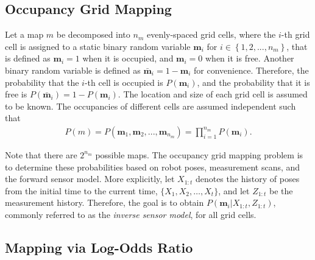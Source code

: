 \documentclass[letterpaper, 10pt, conference]{ieeeconf}
\newcommand{\braces}[1]{\ensuremath{\left\{ #1 \right\}}}
\begin{document}
	
\subsection{Occupancy Grid Mapping}

Let a map $m$ be decomposed into $n_m$ evenly-spaced grid cells, where the $i$-th grid cell is assigned to a static binary random variable $\mathbf{m}_i$ for $i\in\braces{1,2,...,n_m}$, that is defined as $\mathbf{m}_i=1$ when it is occupied, and $\mathbf{m}_i=0$ when it is free. Another binary random variable is defined as $\bar{\mathbf{m}}_i=1-\mathbf{m}_i$ for convenience.
Therefore, the probability that the $i$-th cell is occupied is $P(\mathbf{m}_i)$, and the probability that it is free is $P(\bar{\mathbf{m}}_i)=1-P(\mathbf{m}_i)$. The location and size of each grid cell is assumed to be known.
The occupancies of different cells are assumed independent such that
\begin{align}
P(m)=P(\mathbf{m}_1,\mathbf{m}_2,...,\mathbf{m}_{n_m})=\prod_{i=1}^{n_m}P(\mathbf{m}_i).
\end{align}

Note that there are $2^{n_{m}}$ possible maps. The occupancy grid mapping problem is to determine these probabilities based on robot poses, measurement scans, and the forward sensor model. More explicitly, let $X_{1:t}$ denotes the history of poses from the initial time to the current time, $\{X_1,X_2,\ldots, X_t\}$, and let $Z_{1:t}$ be the measurement history. Therefore, the goal is to obtain $P(\mathbf{m}_i|X_{1:t},Z_{1:t})$, commonly referred to as the \emph{inverse sensor model}, for all grid cells.

	
\subsection{Mapping via Log-Odds Ratio}
\end{document}
